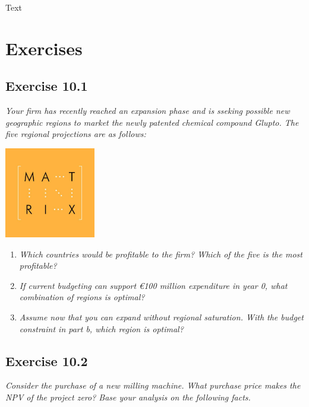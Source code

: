 \documentclass[]{book}
\newcommand{\euro}{€}
\theoremstyle{definition}
\theoremstyle{definition}
\theoremstyle{remark}
\begin{document}
Text

\section{Exercises}\label{exercises-9}

\subsection{Exercise 10.1}\label{exercise-10.1}

\emph{Your firm has recently reached an expansion phase and is sseking
possible new geographic regions to market the newly patented chemical
compound Glupto. The five regional projections are as follows:}
\citep[p.338]{book}

\begin{center}\includegraphics[width=150px]{figures/matrix} \end{center}

\begin{enumerate}
\def\labelenumi{\alph{enumi}.}
\item
  \emph{Which countries would be profitable to the firm? Which of the
  five is the most profitable?} \citep[p.338]{book}
\item
  \emph{If current budgeting can support \euro{}100 million expenditure
  in year 0, what combination of regions is optimal?}
  \citep[p.338]{book}
\item
  \emph{Assume now that you can expand without regional saturation. With
  the budget constraint in part b, which region is optimal?}
  \citep[p.338]{book}
\end{enumerate}

\subsection{Exercise 10.2}\label{exercise-10.2}

\emph{Consider the purchase of a new milling machine. What purchase
price makes the NPV of the project zero? Base your analysis on the
following facts.} \citep[p.338]{book}
\end{document}
